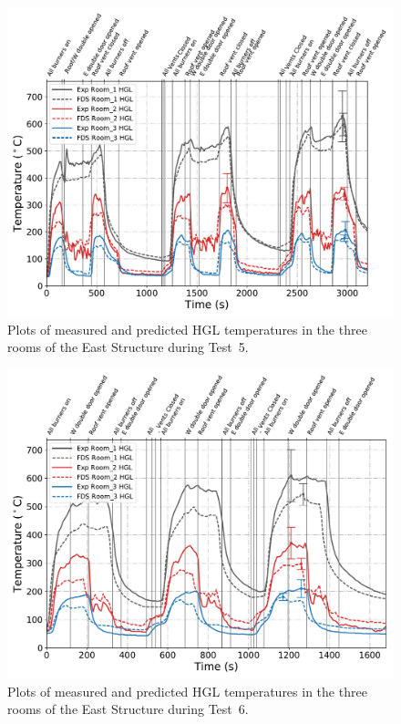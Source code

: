 \begin{figure}[!h]
	\centering
	\includegraphics[width=\columnwidth]{Figures/Plots/Validation/Temperature/Test_5_HGL}
	\caption[Plots of measured and predicted HGL temperatures during Test~5.]{Plots of measured and predicted HGL temperatures in the three rooms of the East Structure during Test~5.}
	\label{fig:HGL_data_Test5}
\end{figure}

\begin{figure}[!h]
	\centering
	\includegraphics[width=\columnwidth]{Figures/Plots/Validation/Temperature/Test_6_HGL}
	\caption[Plots of measured and predicted HGL temperatures during Test~6.]{Plots of measured and predicted HGL temperatures in the three rooms of the East Structure during Test~6.}
	\label{fig:HGL_data_Test6}
\end{figure}

